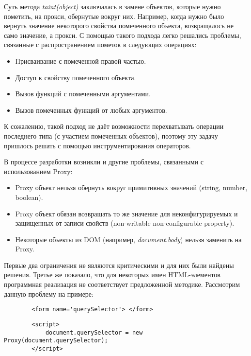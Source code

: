 	Суть метода \textit{taint(object)} заключалась в замене объектов, которые нужно пометить, на прокси, обернутые вокруг них. Например, когда нужно было вернуть значение некоторого свойства помеченного объекта, возвращалось не само значение, а прокси. С помощью такого подхода легко решались проблемы, связанные с распространением пометок в следующих операциях:
	

	\begin{itemize}
		\item Присваивание с помеченной правой частью.
		\item Доступ к свойству помеченного объекта.
		\item Вызов функций с помеченными аргументами.
		\item Вызов помеченных функций от любых аргументов.
	\end{itemize}


	К сожалению, такой подход не даёт возможности перехватывать операции последнего типа (с участием помеченных объектов), поэтому эту задачу пришлось решать с помощью инструментирования операторов.


	В процессе разработки возникли и другие проблемы, связанными с использованием Proxy:


	\begin{itemize}
		\item Proxy объект нельзя обернуть вокруг примитивных значений (string, number, boolean).
		\item Proxy объект обязан возвращать то же значение для неконфигурируемых и защищенных от записи свойств (non-writable non-configurable property).
		\item Некоторые объекты из DOM (например, \textit{document.body}) нельзя заменить на Proxy.
	\end{itemize}


	Первые два ограничения не являются критическими и для них были найдены решения. Третье же показало, что для некоторых имен HTML-элементов программная реализация не соответствует предложенной методике. Рассмотрим данную проблему на примере:

	\begin{lstlisting}
		<form name='querySelector'> </form>
	\end{lstlisting}

	\begin{lstlisting}
		<script>
			document.querySelector = new Proxy(document.querySelector);
		</script>
	\end{lstlisting}

